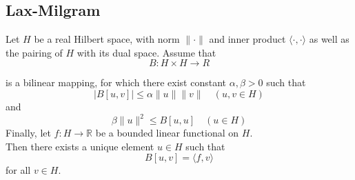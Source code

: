 \documentclass[14pt,a4paper]{scrartcl}
\numberwithin{equation}{section}
\newcommand{\R}{\mathbb{R}}
\begin{document}
\subsection{Lax-Milgram}
Let $H$ be a real Hilbert space, with norm $\| \cdot \|$ and inner product $\langle \cdot, \cdot \rangle$ as well as the pairing of $H$ with its dual space. Assume that
	\[ B \colon H \times H \rightarrow R  \]

is a bilinear mapping, for which there exist constant $\alpha, \beta > 0$ such that
	\[ |B[u, v]| \leq \alpha \| u \| \| v \| \quad (u, v \in H) \]
and
	\[ \beta \| u \|^{2} \leq B[u, u] \quad ( u \in H) \]
Finally, let $f \colon H \rightarrow \R$ be a bounded linear functional on $H$. \\

Then there exists a unique element $u \in H$ such that
	\[ B[u, v] = \langle f, v \rangle \]
for all $v \in H$.
\end{document}
